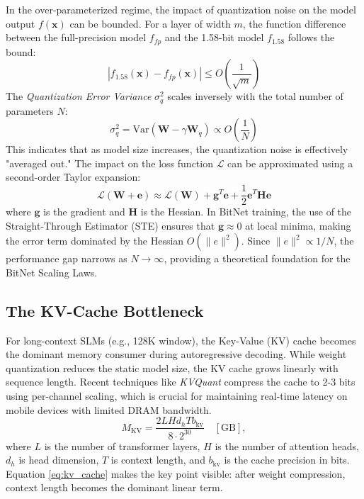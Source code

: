 \documentclass[twocolumn,10pt]{article}
\begin{document}
In the over-parameterized regime, the impact of quantization noise on the model output $f(\mathbf{x})$ can be bounded. For a layer of width $m$, the function difference between the full-precision model $f_{fp}$ and the 1.58-bit model $f_{1.58}$ follows the bound:
\begin{equation}
|f_{1.58}(\mathbf{x}) - f_{fp}(\mathbf{x})| \le O\left(\frac{1}{\sqrt{m}}\right)
\end{equation}
The \textit{Quantization Error Variance} $\sigma_q^2$ scales inversely with the total number of parameters $N$:
\begin{equation}
\sigma_q^2 = \text{Var}(\mathbf{W} - \gamma \mathbf{W}_q) \propto O\left(\frac{1}{N}\right)
\end{equation}
This indicates that as model size increases, the quantization noise is effectively "averaged out." The impact on the loss function $\mathcal{L}$ can be approximated using a second-order Taylor expansion:
\begin{equation}
\mathcal{L}(\mathbf{W} + \mathbf{e}) \approx \mathcal{L}(\mathbf{W}) + \mathbf{g}^T \mathbf{e} + \frac{1}{2} \mathbf{e}^T \mathbf{H} \mathbf{e}
\end{equation}
where $\mathbf{g}$ is the gradient and $\mathbf{H}$ is the Hessian. In BitNet training, the use of the Straight-Through Estimator (STE) ensures that $\mathbf{g} \approx 0$ at local minima, making the error term dominated by the Hessian $O(\|e\|^2)$. Since $\|e\|^2 \propto 1/N$, the performance gap narrows as $N \to \infty$, providing a theoretical foundation for the BitNet Scaling Laws.

\subsection{The KV-Cache Bottleneck}
For long-context SLMs (e.g., 128K window), the Key-Value (KV) cache becomes the dominant memory consumer during autoregressive decoding. While weight quantization reduces the static model size, the KV cache grows linearly with sequence length. Recent techniques like \textit{KVQuant} \cite{kvquant2024} compress the cache to 2-3 bits using per-channel scaling, which is crucial for maintaining real-time latency on mobile devices with limited DRAM bandwidth.
\begin{equation}
M_{\mathrm{KV}} =
\frac{2 L H d_h T b_{\mathrm{kv}}}{8\cdot 2^{30}}
\quad [\mathrm{GB}],
\label{eq:kv_cache}
\end{equation}
where $L$ is the number of transformer layers, $H$ is the number of attention heads, $d_h$ is head dimension, $T$ is context length, and $b_{\mathrm{kv}}$ is the cache precision in bits. Equation \ref{eq:kv_cache} makes the key point visible: after weight compression, context length becomes the dominant linear term.
\end{document}
